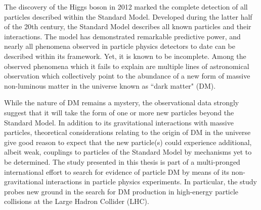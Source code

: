 \label{chapter:introduction}

The discovery of the Higgs boson in 2012 \cite{atlas_higgs_2012, cms_higgs_2012} marked the complete detection of all particles described within the Standard Model. Developed during the latter half of the 20th century, the Standard Model describes all known particles and their interactions. The model has demonstrated remarkable predictive power, and nearly all phenomena observed in particle physics detectors to date can be described within its framework. Yet, it is known to be incomplete. Among the observed phenomena which it fails to explain \cite{einstein_1920, neutrino_oscillations_1998, Canetti_2012} are multiple lines of astronomical observation which collectively point to the abundance of a new form of massive non-luminous matter in the universe known as ``dark matter" (DM). 

While the nature of DM remains a mystery, the observational data strongly suggest that it will take the form of one or more new particles beyond the Standard Model. In addition to its gravitational interactions with massive particles, theoretical considerations relating to the origin of DM in the universe give good reason to expect that the new particle(s) could experience additional, albeit weak, couplings to particles of the Standard Model by mechanisms yet to be determined. The study presented in this thesis is part of a multi-pronged international effort to search for evidence of particle DM by means of its non-gravitational interactions in particle physics experiments. In particular, the study probes new ground in the search for DM production in high-energy particle collisions at the Large Hadron Collider (LHC). 

